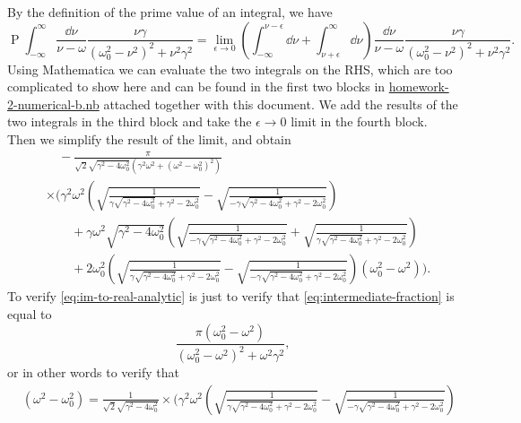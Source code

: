 \documentclass[hyperref, a4paper]{article}
\DeclareMathOperator{\primevalue}{P}
\begin{document}
\begin{itemize}
    By the definition of the prime value of an integral, we have 
    \[
        \primevalue \int_{-\infty}^\infty \frac{\dd{\nu}}{\nu - \omega} \frac{ \nu \gamma}{\left(\omega_{0}^{2}-\nu^{2}\right)^{2}+\nu^{2} \gamma^{2}} = \lim_{\epsilon \to 0} \left( \int_{-\infty}^{\nu - \epsilon} \dd{\nu} + \int_{\nu + \epsilon}^\infty \dd{\nu} \right) \frac{\dd{\nu}}{\nu - \omega} \frac{ \nu \gamma}{\left(\omega_{0}^{2}-\nu^{2}\right)^{2}+\nu^{2} \gamma^{2}}.
    \]
    Using Mathematica we can evaluate the two integrals on the RHS, which are too complicated to show here and can be found in the first two blocks in \href{homework-2-numerical-b.nb}{homework-2-numerical-b.nb} attached together with this document.
    We add the results of the two integrals in the third block and take the $\epsilon \to 0$ limit in the fourth block.
    Then we simplify the result of the limit, and obtain 
    \begin{equation}
        \begin{aligned}
            &\quad -\frac{\pi}{\sqrt{2} \sqrt{\gamma ^2-4 \omega_0^2} \left(\gamma ^2 \omega^2+\left(\omega ^2-\omega_0^2\right)^2\right)} \\
            &\times \Biggl( \gamma ^2 \omega ^2 \left(\sqrt{\frac{1}{\gamma  \sqrt{\gamma ^2-4 \omega_0^2}+\gamma ^2-2 \omega_0^2}}-\sqrt{\frac{1}{-\gamma  \sqrt{\gamma ^2-4 \omega_0^2}+\gamma ^2-2 \omega_0^2}}\right) \\
            &\quad\quad +\gamma  \omega ^2 \sqrt{\gamma ^2-4 \omega_0^2} \left(\sqrt{\frac{1}{-\gamma  \sqrt{\gamma ^2-4 \omega_0^2}+\gamma ^2-2 \omega_0^2}}+\sqrt{\frac{1}{\gamma  \sqrt{\gamma ^2-4 \omega_0^2}+\gamma ^2-2 \omega_0^2}}\right) \\
            &\quad \quad +2 \omega_0^2 \left(\sqrt{\frac{1}{\gamma  \sqrt{\gamma ^2-4 \omega_0^2}+\gamma ^2-2 \omega_0^2}}-\sqrt{\frac{1}{-\gamma  \sqrt{\gamma ^2-4 \omega_0^2}+\gamma ^2-2 \omega_0^2}}\right) \left(\omega_0^2-\omega^2\right) \Biggr) .
        \end{aligned}
        \label{eq:intermediate-fraction}
    \end{equation}
    To verify \eqref{eq:im-to-real-analytic} is just to verify that \eqref{eq:intermediate-fraction} is equal to 
    \[
        \frac{\pi \left(\omega_0^{2}-\omega^{2}\right)}{\left(\omega_{0}^{2}-\omega^{2}\right)^{2}+\omega^{2} \gamma^{2}},
    \]
    or in other words to verify that 
    \begin{equation}
        \begin{aligned}
            &\left(\omega^{2}-\omega_0^{2}\right) = \frac{1}{\sqrt{2} \sqrt{\gamma ^2-4 \omega_0^2} } \times \Biggl( \gamma ^2 \omega ^2 \left(\sqrt{\frac{1}{\gamma  \sqrt{\gamma ^2-4 \omega_0^2}+\gamma ^2-2 \omega_0^2}}-\sqrt{\frac{1}{-\gamma  \sqrt{\gamma ^2-4 \omega_0^2}+\gamma ^2-2 \omega_0^2}}\right) \\

\end{aligned}
\end{equation}
\end{itemize}
\end{document}
